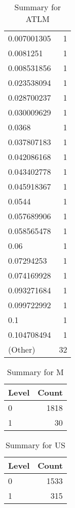 \begin{table}[ht]
\begin{tabular}{lr}
  0.007001305 &   1 \\ 
  0.0081251 &   1 \\ 
  0.008531856 &   1 \\ 
  0.023538094 &   1 \\ 
  0.028700237 &   1 \\ 
  0.030009629 &   1 \\ 
  0.0368 &   1 \\ 
  0.037807183 &   1 \\ 
  0.042086168 &   1 \\ 
  0.043402778 &   1 \\ 
  0.045918367 &   1 \\ 
  0.0544 &   1 \\ 
  0.057689906 &   1 \\ 
  0.058565478 &   1 \\ 
  0.06 &   1 \\ 
  0.07294253 &   1 \\ 
  0.074169928 &   1 \\ 
  0.093271684 &   1 \\ 
  0.099722992 &   1 \\ 
  0.1 &   1 \\ 
  0.104708494 &   1 \\ 
  (Other) &  32 \\ 
   \hline
\end{tabular}
\caption{Summary for ATLM} 
\label{tab: ATLM}
\end{table}
\begin{table}[ht]
\centering
\begin{tabular}{lr}
  \hline
Level & Count \\ 
  \hline
0 & 1818 \\ 
  1 &  30 \\ 
   \hline
\end{tabular}
\caption{Summary for M} 
\label{tab: M}
\end{table}
\begin{table}[ht]
\centering
\begin{tabular}{lr}
  \hline
Level & Count \\ 
  \hline
0 & 1533 \\ 
  1 & 315 \\ 
   \hline
\end{tabular}
\caption{Summary for US} 
\label{tab: US}
\end{table}
